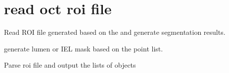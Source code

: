 \documentclass[letterpaper,10pt,english]{sphinxmanual}
\begin{document}
\section{read oct roi file}
\label{\detokenize{index:module-util.read_oct_roi_file}}\label{\detokenize{index:read-oct-roi-file}}
Read ROI file generated based on the and generate segmentation results.

\begin{fulllineitems}
\label{\detokenize{index:util.read_oct_roi_file.lumen_iel_mask}}
generate lumen or IEL mask based on the point list.

\end{fulllineitems}


\begin{fulllineitems}
\label{\detokenize{index:util.read_oct_roi_file.roi_file_parser}}
Parse roi file and output the lists of objects

\end{fulllineitems}
\end{document}
